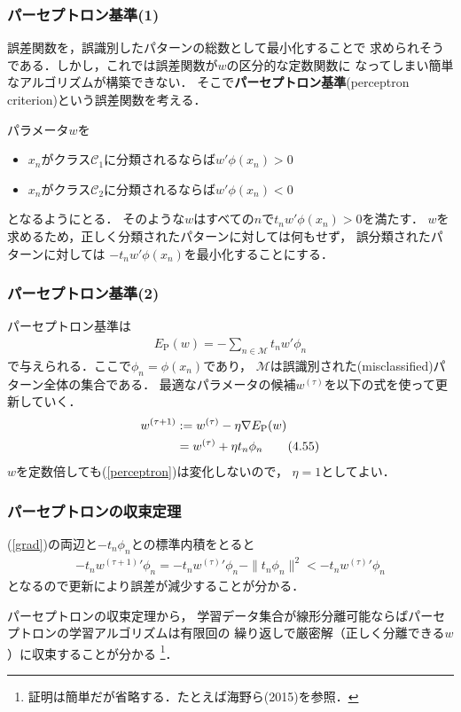 \documentclass[10pt,%
hyperref={unicode}]{beamer}
\newcommand{\braref}[1]{{\fontfamily{cmr}\selectfont (\ref{#1})}}
\begin{document}
\begin{frame}
    \frametitle{パーセプトロン基準(1)}
    誤差関数を，誤識別したパターンの総数として最小化することで
    求められそうである．しかし，これでは誤差関数が$w$の区分的な定数関数に
    なってしまい簡単なアルゴリズムが構築できない．
    そこで\textbf{パーセプトロン基準}(perceptron criterion)という誤差関数を考える．

    \bigskip

    パラメータ$w$を

    \smallskip

    \begin{itemize}
        \item $x_n$がクラス$\mathcal{C}_1$に分類されるならば$w'\phi(x_n) > 0$
        \item $x_n$がクラス$\mathcal{C}_2$に分類されるならば$w'\phi(x_n) < 0$
    \end{itemize}

    \smallskip

    となるようにとる．
    そのような$w$はすべての$n$で$t_nw'\phi(x_n) > 0$を満たす．
    $w$を求めるため，正しく分類されたパターンに対しては何もせず，
    誤分類されたパターンに対しては
    $-t_n w'\phi(x_n)$を最小化することにする．
\end{frame}

\begin{frame}
    \frametitle{パーセプトロン基準(2)}
    パーセプトロン基準は
    \begin{align}
        E_\mathrm{P}(w) = - \sum_{n \in \mathcal{M}} t_n w'\phi_n \tag{4.54}
    \end{align}
    で与えられる．ここで$\phi_n = \phi(x_n)$であり，
    $\mathcal{M}$は誤識別された(misclassified)パターン全体の集合である．
    最適なパラメータの候補$w^{(\tau)}$を以下の式を使って更新していく．
    \begin{align}
        w^{(\tau + 1)} &:= w^{(\tau)} - \eta \nabla E_\mathrm{P}(w) \notag \\
                       &= w^{(\tau)} + \eta t_n \phi_n \tag{4.55} \label{grad}
    \end{align}
    $w$を定数倍しても\braref{perceptron}は変化しないので，
    $\eta = 1$としてよい．
\end{frame}

\begin{frame}
    \frametitle{パーセプトロンの収束定理}
    \braref{grad}の両辺と$-t_n\phi_n$との標準内積をとると
    \begin{align}
        - t_n w^{(\tau + 1)}{}'\phi_n
        = - t_n w^{(\tau)}{}' \phi_n - \|t_n\phi_n\|^2 < - t_n w^{(\tau)}{}'\phi_n
        \tag{4.56}
    \end{align}
    となるので更新により誤差が減少することが分かる．

    \bigskip

    パーセプトロンの収束定理から，
    学習データ集合が線形分離可能ならばパーセプトロンの学習アルゴリズムは有限回の
    繰り返しで厳密解（正しく分離できる$w$）に収束することが分かる
    \footnote{証明は簡単だが省略する．たとえば海野ら(2015)を参照．}．\nocite{unno2015}
\end{frame}
\end{document}
